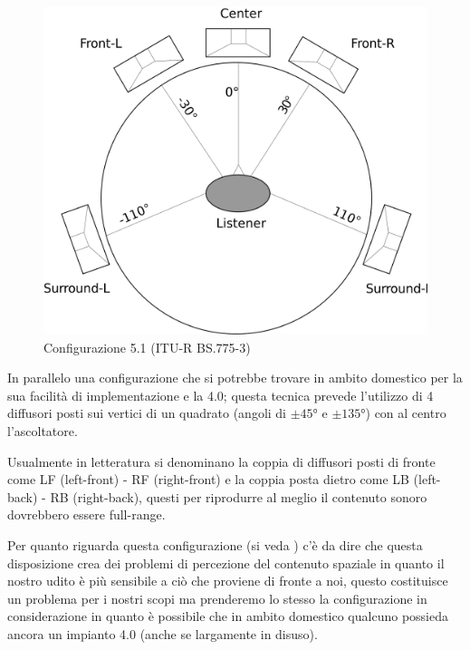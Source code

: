 \documentclass[12pt,a4paper]{report}
\begin{document}
\begin{figure}[htbp]
	\centering
	\includegraphics[scale=0.18]{figures/5-1.png}
	\caption {Configurazione 5.1 (ITU-R BS.775-3)}
	\label{fig:5.1}
	\end{figure}

In parallelo una configurazione che si potrebbe trovare in ambito domestico per la sua facilità di implementazione e la 4.0; questa tecnica prevede l'utilizzo di 4 diffusori posti sui vertici di un quadrato (angoli di $\pm45°$ e $\pm135°$) con al centro l'ascoltatore.

Usualmente in letteratura si denominano la coppia di diffusori posti di fronte come LF (left-front) - RF (right-front) e la coppia posta dietro come LB (left-back) - RB (right-back), questi per riprodurre al meglio il contenuto sonoro dovrebbero essere full-range.

Per quanto riguarda questa configurazione (si veda \cite{surround}) c'è da dire che questa disposizione crea dei problemi di percezione del contenuto spaziale in quanto il nostro udito è più sensibile a ciò che proviene di fronte a noi, questo costituisce un problema per i nostri scopi ma prenderemo lo stesso la configurazione in considerazione in quanto è possibile che in ambito domestico qualcuno possieda ancora un impianto 4.0 (anche se largamente in disuso).
\end{document}
